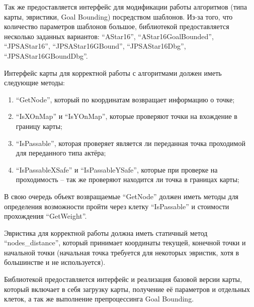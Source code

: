 Так же предоставляется интерфейс для модификации работы алгоритмов (типа карты, эвристики, Goal Bounding) посредством шаблонов. Из-за того, что количество параметров шаблонов большое, библиотекой предоставляется несколько заданных вариантов: ``AStar16'', ``AStar16GoalBounded'', ``JPSAStar16'', ``JPSAStar16GBound'', ``JPSAStar16Dbg'', ``JPSAStar16GBoundDbg''.

Интерфейс карты для корректной работы с алгоритмами должен иметь следующие методы:

\begin{enumerate}
	\item ``GetNode'', который по координатам возвращает информацию о точке;
	\item ``IsXOnMap'' и ``IsYOnMap'', которые проверяют точки на вхождение в границу карты;
	\item ``IsPassable'', которая проверяет является ли переданная точка проходимой для переданного типа актёра;
	\item ``IsPassableXSafe'' и ``IsPassableYSafe'', которые при проверке на проходимость -- так же проверяют находится ли точка в границах карты; 
\end{enumerate}

В свою очередь объект возвращаемые ``GetNode'' должен иметь методы для определения возможности пройти через клетку ``IsPassable'' и стоимости прохождения ``GetWeight''.

Эвристика для корректной работы должна иметь статичный метод ``nodes\_distance'', который принимает координаты текущей, конечной точки и начальной точки (начальная точка требуется для некоторых эвристик, хотя в большинстве и не используется).

Библиотекой предоставляется интерфейс и реализация базовой версии карты, который включает в себя загрузку карты, получение её параметров и отдельных клеток, а так же выполнение препроцессинга Goal Bounding.   
